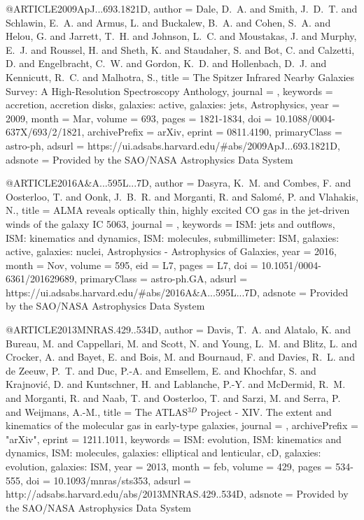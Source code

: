 \documentclass[longauth]{aa}
\begin{document}
@ARTICLE{2009ApJ...693.1821D,
       author = {{Dale}, D.~A. and {Smith}, J.~D.~T. and {Schlawin}, E.~A. and {Armus}, L. and {Buckalew}, B.~A. and {Cohen}, S.~A. and {Helou}, G. and {Jarrett}, T.~H. and {Johnson}, L.~C. and {Moustakas}, J. and {Murphy}, E.~J. and {Roussel}, H. and {Sheth}, K. and {Staudaher}, S. and {Bot}, C. and {Calzetti}, D. and {Engelbracht}, C.~W. and {Gordon}, K.~D. and {Hollenbach}, D.~J. and {Kennicutt}, R.~C. and {Malhotra}, S.},
        title = {The Spitzer Infrared Nearby Galaxies Survey: A High-Resolution Spectroscopy Anthology},
      journal = {\apj},
     keywords = {accretion, accretion disks, galaxies: active, galaxies: jets, Astrophysics},
         year = 2009,
        month = Mar,
       volume = {693},
        pages = {1821-1834},
          doi = {10.1088/0004-637X/693/2/1821},
archivePrefix = {arXiv},
       eprint = {0811.4190},
 primaryClass = {astro-ph},
       adsurl = {https://ui.adsabs.harvard.edu/#abs/2009ApJ...693.1821D},
      adsnote = {Provided by the SAO/NASA Astrophysics Data System}
}

@ARTICLE{2016A&A...595L...7D,
       author = {{Dasyra}, K.~M. and {Combes}, F. and {Oosterloo}, T. and {Oonk}, J.~B.~R. and {Morganti}, R. and {Salom{\'e}}, P. and {Vlahakis}, N.},
        title = {ALMA reveals optically thin, highly excited CO gas in the jet-driven winds of the galaxy IC 5063},
      journal = {\aap},
     keywords = {ISM: jets and outflows, ISM: kinematics and dynamics, ISM: molecules, submillimeter: ISM, galaxies: active, galaxies: nuclei, Astrophysics - Astrophysics of Galaxies},
         year = 2016,
        month = Nov,
       volume = {595},
          eid = {L7},
        pages = {L7},
          doi = {10.1051/0004-6361/201629689},
 primaryClass = {astro-ph.GA},
       adsurl = {https://ui.adsabs.harvard.edu/#abs/2016A&A...595L...7D},
      adsnote = {Provided by the SAO/NASA Astrophysics Data System}
}

@ARTICLE{2013MNRAS.429..534D,
   author = {{Davis}, T.~A. and {Alatalo}, K. and {Bureau}, M. and {Cappellari}, M. and {Scott}, N. and {Young}, L.~M. and {Blitz}, L. and {Crocker}, A. and {Bayet}, E. and {Bois}, M. and {Bournaud}, F. and {Davies}, R.~L. and {de Zeeuw}, P.~T. and {Duc}, P.-A. and {Emsellem}, E. and {Khochfar}, S. and {Krajnovi{\'c}}, D. and {Kuntschner}, H. and {Lablanche}, P.-Y. and {McDermid}, R.~M. and {Morganti}, R. and {Naab}, T. and {Oosterloo}, T. and {Sarzi}, M. and {Serra}, P. and {Weijmans}, A.-M.},
    title = {The ATLAS$^{3D}$ Project - XIV. The extent and kinematics of the molecular gas in early-type galaxies},
  journal = {\mnras},
archivePrefix = "arXiv",
   eprint = {1211.1011},
 keywords = {ISM: evolution, ISM: kinematics and dynamics, ISM: molecules, galaxies: elliptical and lenticular, cD, galaxies: evolution, galaxies: ISM},
     year = 2013,
    month = feb,
   volume = 429,
    pages = {534-555},
      doi = {10.1093/mnras/sts353},
   adsurl = {http://adsabs.harvard.edu/abs/2013MNRAS.429..534D},
  adsnote = {Provided by the SAO/NASA Astrophysics Data System}
}
\end{document}
